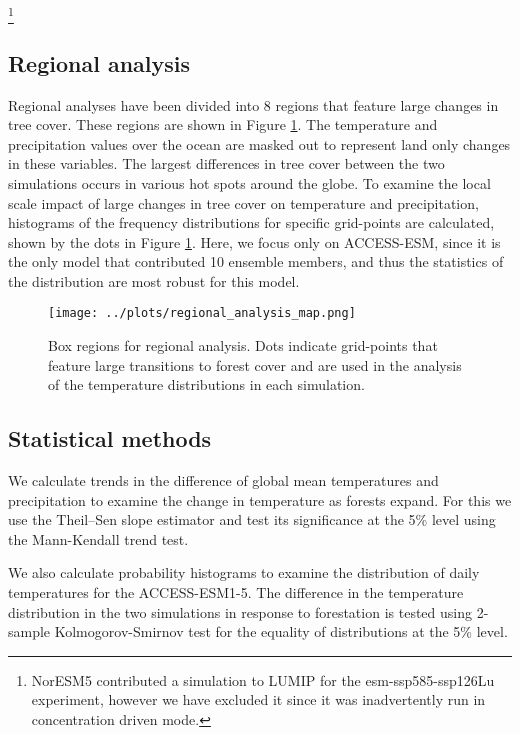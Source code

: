 \documentclass[]{article}
\begin{document}
\footnote{NorESM5 contributed a simulation to LUMIP for the esm-ssp585-ssp126Lu experiment, however we have excluded it since it was inadvertently run in concentration driven mode.}

\subsection{Regional analysis}

Regional analyses have been divided into 8 regions that feature large changes in tree cover.
These regions are shown in Figure \ref{fig:box_regions}.
The temperature and precipitation values over the ocean are masked out to represent land only changes in these variables.
The largest differences in tree cover between the two simulations occurs in various hot spots around the globe.
To examine the local scale impact of large changes in tree cover on temperature and precipitation, histograms of the frequency distributions for specific grid-points are calculated, shown by the dots in Figure \ref{fig:box_regions}.
Here, we focus only on ACCESS-ESM, since it is the only model that contributed 10 ensemble members, and thus the statistics of the distribution are most robust for this model.

\begin{figure}[H]
    \centering
    \texttt{[image: ../plots/regional\_analysis\_map.png]}
    \caption{Box regions for regional analysis. Dots indicate grid-points that feature large transitions to forest cover and are used in the analysis of the temperature distributions in each simulation.}
    \label{fig:box_regions}
\end{figure}

\subsection{Statistical methods}

We calculate trends in the difference of global mean temperatures and precipitation to examine the change in temperature as forests expand.
For this we use the Theil–Sen slope estimator and test its significance at the 5\% level using the Mann-Kendall trend test.

We also calculate probability histograms to examine the distribution of daily temperatures for the ACCESS-ESM1-5.
The difference in the temperature distribution in the two simulations in response to forestation is tested using 2-sample Kolmogorov-Smirnov test for the equality of distributions at the 5\% level.
\end{document}

